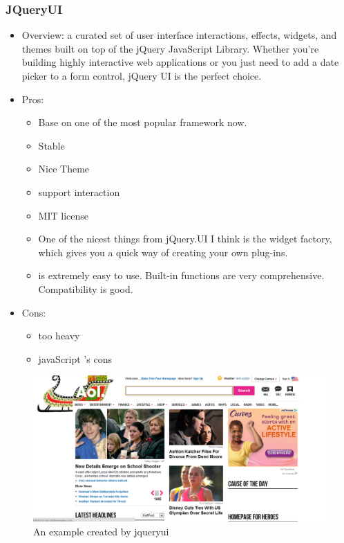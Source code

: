 \documentclass[14pt,a4paper]{extreport}
\begin{document}
		\subsubsection{JQueryUI}
			\begin{itemize}
				\item Overview: a curated set of user interface interactions, effects, widgets, and themes built on top of the jQuery JavaScript Library. Whether you're building highly interactive web applications or you just need to add a date picker to a form control, jQuery UI is the perfect choice.
				\item Pros: 
					\begin{itemize}
						\item Base on one of the most popular framework now.
						\item Stable
						\item Nice Theme
						\item support interaction
						\item MIT license
						\item One of the nicest things from jQuery.UI I think is the widget factory, which gives you a quick way of creating your own plug-ins.
						\item is extremely easy to use. Built-in functions are very comprehensive. Compatibility is good.
					\end{itemize}
				\item Cons:
					\begin{itemize}
						\item too heavy
						\item javaScript 's cons
					
					\end{itemize}
			\end{itemize}
			\begin{figure}
				\begin{center}
				\includegraphics[scale=0.5]{jqueryui.png}
				\caption{An example created by jqueryui}
				\end{center}
			\end{figure}
\end{document}
